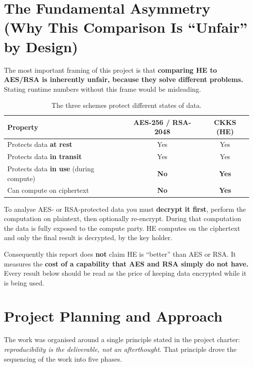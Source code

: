 \documentclass[11pt,a4paper]{article}
\begin{document}
\section{The Fundamental Asymmetry (Why This Comparison Is ``Unfair'' by Design)}
\label{sec:asymmetry}

The most important framing of this project is that \textbf{comparing HE to
AES/RSA is inherently unfair, because they solve different problems.} Stating
runtime numbers without this frame would be misleading.

\begin{table}[H]
\centering
\caption{The three schemes protect different states of data.}
\begin{tabularx}{\linewidth}{Xcc}
\toprule
\textbf{Property} & \textbf{AES-256 / RSA-2048} & \textbf{CKKS (HE)}\\
\midrule
Protects data \textbf{at rest}                 & Yes & Yes\\
Protects data \textbf{in transit}              & Yes & Yes\\
Protects data \textbf{in use} (during compute) & \textbf{No} & \textbf{Yes}\\
Can compute on ciphertext                      & \textbf{No} & \textbf{Yes}\\
\bottomrule
\end{tabularx}
\end{table}

To analyse AES- or RSA-protected data you must \textbf{decrypt it first}, perform
the computation on plaintext, then optionally re-encrypt. During that computation
the data is fully exposed to the compute party. HE computes on the ciphertext and
only the final result is decrypted, by the key holder.

Consequently this report does \textbf{not} claim HE is ``better'' than AES or
RSA. It measures the \textbf{cost of a capability that AES and RSA simply do not
have.} Every result below should be read as the price of keeping data encrypted
while it is being used.

\section{Project Planning and Approach}

The work was organised around a single principle stated in the project charter:
\emph{reproducibility is the deliverable, not an afterthought}. That principle
drove the sequencing of the work into five phases.
\end{document}
